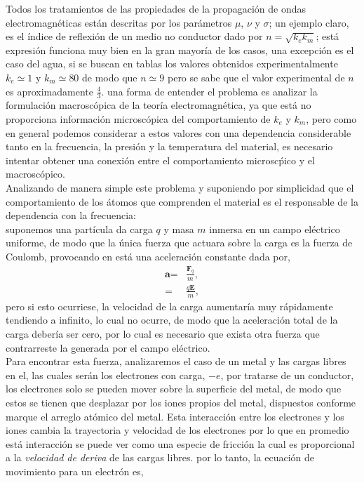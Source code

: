 \documentclass[11pt,fleqn]{book} %
\begin{document}
Todos los tratamientos de las propiedades de la propagaci\'on de ondas electromagn\'eticas est\'an descritas por los par\'ametros $\mu$, $\nu$ y $\sigma$; un ejemplo claro, es el \'indice de reflexi\'on de un medio no conductor dado por $n=\sqrt{k_{e}k_{m}}$; est\'a expresi\'on funciona muy bien en la gran mayor\'ia de los casos, una excepci\'on es el caso del agua, si se buscan en tablas los valores obtenidos experimentalmente $k_e\simeq 1$ y $k_m\simeq 80$ de modo que $n\simeq 9$ pero se sabe que el valor experimental de $n$ es aproximadamente $\frac{4}{3}$. una forma de entender el problema es analizar la formulaci\'on macrosc\'opica de la teor\'ia electromagn\'etica, ya que est\'a no proporciona informaci\'on microsc\'opica del comportamiento de $k_e$ y $k_m$, pero como en general podemos considerar a estos valores con una dependencia considerable tanto en la frecuencia, la presi\'on y la temperatura del material, es necesario intentar obtener una conexi\'on entre el comportamiento microsc\'pico y el macrosc\'opico.\\
Analizando de manera simple este problema y suponiendo por simplicidad que el comportamiento de los \'atomos que comprenden el material es el responsable de la dependencia con la frecuencia:\\
suponemos una part\'icula da carga $q$ y masa $m$ inmersa en un campo el\'ectrico uniforme, de modo que la \'unica fuerza que actuara sobre la carga es la fuerza de Coulomb, provocando en est\'a una aceleraci\'on constante dada por,
\begin{equation*}
\begin{split}
\textbf{a}=&\frac{\textbf{F}_q}{m},\\
=&\frac{q\textbf{E}}{m},
\end{split}
\end{equation*}
pero si esto ocurriese, la velocidad de la carga aumentar\'ia muy r\'apidamente tendiendo a infinito, lo cual no ocurre, de modo que la aceleraci\'on total de la carga deber\'ia ser cero, por lo cual es necesario que exista otra fuerza que contrarreste la generada por el campo el\'ectrico.\\
Para encontrar esta fuerza, analizaremos el caso de un metal y las cargas libres en el, las cuales ser\'an los electrones con carga, $-e$, por tratarse de un conductor, los electrones solo se pueden mover sobre la superficie del metal, de modo que estos se tienen que desplazar por los iones propios del metal, dispuestos conforme marque el arreglo at\'omico del metal.
Esta interacci\'on entre los electrones y los iones cambia la trayectoria y velocidad de los electrones por lo que en promedio est\'a interacci\'on se puede ver como una especie de fricci\'on la cual es proporcional a la \textit{velocidad de deriva} de las cargas libres. por lo tanto, la ecuaci\'on de movimiento para un electr\'on es,
\end{document}
